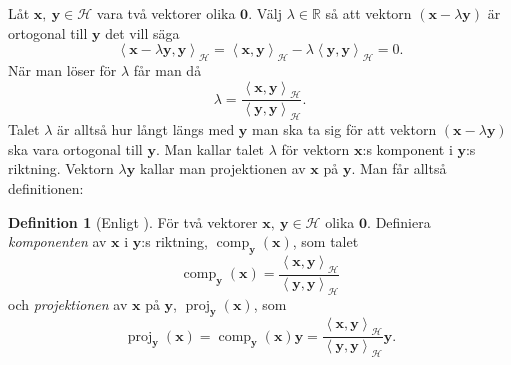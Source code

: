 \documentclass[a4paper, 12pt]{report}
\theoremstyle{definition}
\newtheorem{defi}{Definition}[section]
\theoremstyle{remark}
\newcommand{\bfx}{\mathbf{x}}
\newcommand{\bfy}{\mathbf{y}}
\newcommand{\llangle}{\left\langle}
\newcommand{\rrangle}{\right\rangle}
\newcommand{\inner}[2]{\llangle #1, #2 \rrangle}
\newcommand{\hil}{\mathcal{H}}
\begin{document}
Låt $\bfx,~\bfy\in\hil$ vara två vektorer olika $\mathbf{0}$. Välj $\lambda\in\mathbb{R}$ så att vektorn $\left(\bfx-\lambda\bfy \right)$ är ortogonal till $\bfy$ det vill säga
\begin{equation*}
	\inner{\bfx-\lambda\bfy}{\bfy}_\hil=\inner{\bfx}{\bfy}_\hil-\lambda\inner{\bfy}{\bfy}_\hil=0.
\end{equation*}
När man löser för $\lambda$ får man då
\begin{equation*}
	\lambda=\frac{\inner{\bfx}{\bfy}_\hil}{\inner{\bfy}{\bfy}_\hil}.
\end{equation*}
Talet $\lambda$ är alltså hur långt längs med $\bfy$ man ska ta sig för att vektorn $\left(\bfx-\lambda\bfy\right)$ ska vara ortogonal till $\bfy$.
Man kallar talet $\lambda$ för vektorn $\bfx$:s komponent i $\bfy$:s riktning.
Vektorn $\lambda\bfy$ kallar man projektionen av $\bfx$ på $\bfy$.
Man får alltså definitionen:
\begin{defi}[Enligt \cite{Lang}]
	För två vektorer $\bfx,~\bfy\in\mathcal{H}$ olika $\mathbf{0}$. Definiera \emph{komponenten} av $\bfx$ i $\bfy$:s riktning, $\operatorname{comp}_\bfy\left(\bfx\right)$, som talet  
	\begin{equation*}
		\operatorname{comp}_\bfy\left(\bfx\right)=\frac{\inner{\bfx}{\bfy}_\hil}{\inner{\bfy}{\bfy}_\hil}
	\end{equation*}
	och \emph{projektionen} av $\bfx$ på $\bfy$, $\operatorname{proj}_\bfy\left(\bfx\right)$, som
	\begin{equation*}
		\operatorname{proj}_\bfy\left(\bfx\right)=\operatorname{comp}_\bfy\left(\bfx\right)\bfy=\frac{\inner{\bfx}{\bfy}_\hil}{\inner{\bfy}{\bfy}_\hil}\bfy.
	\end{equation*}
\end{defi}
\end{document}
